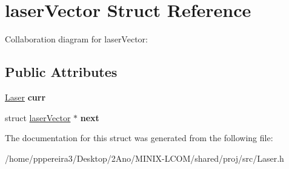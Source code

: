 \hypertarget{structlaserVector}{}\section{laser\+Vector Struct Reference}
\label{structlaserVector}


Collaboration diagram for laser\+Vector\+:
\subsection*{Public Attributes}
\begin{DoxyCompactItemize}
\item 
\hyperlink{structlaser__t}{Laser} {\bfseries curr}
\item 
struct \hyperlink{structlaserVector}{laser\+Vector} $\ast$ {\bfseries next}
\end{DoxyCompactItemize}


The documentation for this struct was generated from the following file\+:\begin{DoxyCompactItemize}
\item 
/home/pppereira3/\+Desktop/2\+Ano/\+M\+I\+N\+I\+X-\/\+L\+C\+O\+M/shared/proj/src/Laser.\+h\end{DoxyCompactItemize}
